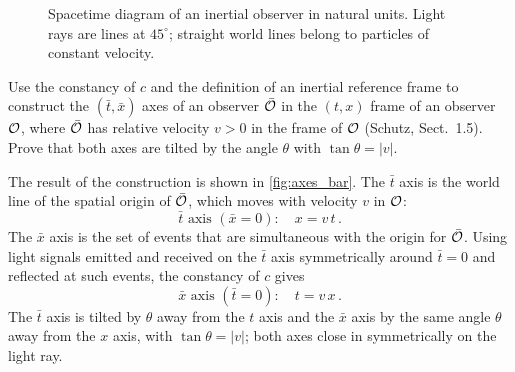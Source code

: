 \begin{figure}[H]
    \centering
    \caption{Spacetime diagram of an inertial observer in natural units. Light rays are lines at
        $45^\circ$; straight world lines belong to particles of constant velocity.}
    \label{fig:worldlines}
\end{figure}

\begin{exercise}[label=ex:axes]
    Use the constancy of $c$ and the definition of an inertial reference frame to construct the
    $(\bar{t}, \bar{x})$ axes of an observer $\bar{\mathcal{O}}$ in the $(t, x)$ frame of an observer $\mathcal{O}$,
    where $\bar{\mathcal{O}}$ has relative velocity $v > 0$ in the frame of $\mathcal{O}$ (Schutz, Sect.~1.5).
    Prove that both axes are tilted by the angle $\theta$ with $\tan\theta = |v|$.
\end{exercise}

The result of the construction is shown in \cref{fig:axes_bar}. The $\bar{t}$ axis is the world
line of the spatial origin of $\bar{\mathcal{O}}$, which moves with velocity $v$ in $\mathcal{O}$:
\begin{equation}
    \bar{t}\text{ axis } (\bar{x} = 0): \quad x = v\,t \, .
\end{equation}
The $\bar{x}$ axis is the set of events that are simultaneous with the origin for $\bar{\mathcal{O}}$. Using
light signals emitted and received on the $\bar{t}$ axis symmetrically around $\bar{t} = 0$ and
reflected at such events, the constancy of $c$ gives
\begin{equation}
    \bar{x}\text{ axis } (\bar{t} = 0): \quad t = v\,x \, .
\end{equation}
The $\bar{t}$ axis is tilted by $\theta$ away from the $t$ axis and the $\bar{x}$ axis by the same
angle $\theta$ away from the $x$ axis, with $\tan\theta = |v|$; both axes close in symmetrically on
the light ray.

